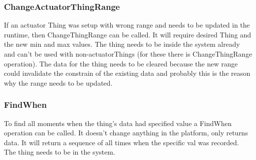 \documentclass{article}
\newcommand{\same}[1]{\\{#1}'={#1}}
\newcommand{\sameObvious}[1]{\same{rooms}\same{allThings}\same{noiseThings}\same{tempThings}\same{lightThings}\same{actuatorThings}  }
\begin{document}
\subsubsection{ChangeActuatorThingRange}
If an actuator Thing was setup with wrong range and needs to be updated in the runtime, then ChangeThingRange can be called. It will require desired Thing and the new min and max values. The thing needs to be inside the system already and can't be used with non-actuatorThings (for these there is ChangeThingRange operation). The data for the thing needs to be cleared because the new range could invalidate the constrain of the existing data and probably this is the reason why the range needs to be updated. 


\label{toc:FindWhen}
\subsubsection{FindWhen}
To find all moments when the thing's data had specified value a FindWhen operation can be called. It doesn't change anything in the platform, only returns data. It will return a sequence of all times when the specific val was recorded. The thing needs to be in the system.
\end{document}
